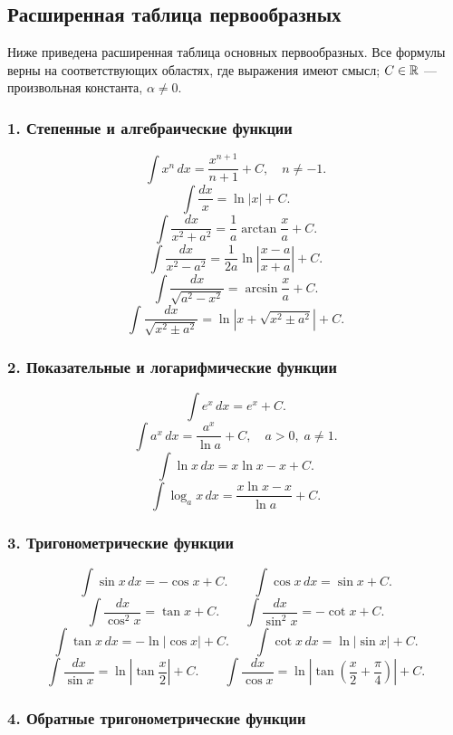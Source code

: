 \subsection{Расширенная таблица первообразных}

Ниже приведена расширенная таблица основных первообразных. Все формулы верны на соответствующих областях, где выражения имеют смысл; $C \in \mathbb{R}$ — произвольная константа, $\alpha \neq 0$.

\subsubsection*{1. Степенные и алгебраические функции}

\[
\int x^n\,dx = \frac{x^{n+1}}{n+1} + C, \quad n \neq -1.
\]
\[
\int \frac{dx}{x} = \ln|x| + C.
\]
\[
\int \frac{dx}{x^2+a^2} = \frac{1}{a}\arctan\frac{x}{a} + C.
\]
\[
\int \frac{dx}{x^2-a^2} = \frac{1}{2a}\ln\left|\frac{x-a}{x+a}\right| + C.
\]
\[
\int \frac{dx}{\sqrt{a^2-x^2}} = \arcsin\frac{x}{a} + C.
\]
\[
\int \frac{dx}{\sqrt{x^2 \pm a^2}} = \ln\left|x + \sqrt{x^2 \pm a^2}\right| + C.
\]

\subsubsection*{2. Показательные и логарифмические функции}

\[
\int e^x\,dx = e^x + C.
\]
\[
\int a^x\,dx = \frac{a^x}{\ln a} + C, \quad a > 0,\; a \neq 1.
\]
\[
\int \ln x\,dx = x\ln x - x + C.
\]
\[
\int \log_a x\,dx = \frac{x\ln x - x}{\ln a} + C.
\]

\subsubsection*{3. Тригонометрические функции}

\[
\int \sin x\,dx = -\cos x + C. \qquad
\int \cos x\,dx = \sin x + C.
\]
\[
\int \frac{dx}{\cos^2 x} = \tan x + C. \qquad
\int \frac{dx}{\sin^2 x} = -\cot x + C.
\]
\[
\int \tan x\,dx = -\ln|\cos x| + C. \qquad
\int \cot x\,dx = \ln|\sin x| + C.
\]
\[
\int \frac{dx}{\sin x} = \ln\left|\tan\frac{x}{2}\right| + C.
\qquad
\int \frac{dx}{\cos x} = \ln\left|\tan\!\left(\frac{x}{2}+\frac{\pi}{4}\right)\right| + C.
\]

\subsubsection*{4. Обратные тригонометрические функции}

